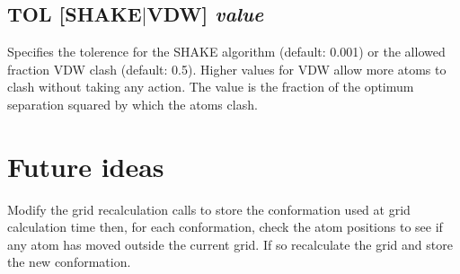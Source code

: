 \documentclass[12pt]{article}
\begin{document}
\subsection{TOL [SHAKE$\mid$VDW] {\em value}}
Specifies the tolerence for the SHAKE algorithm (default: 0.001) or
the allowed fraction VDW clash (default: 0.5). Higher values for VDW
allow more atoms to clash without taking any action. The value is the
fraction of the optimum separation squared by which the atoms clash.

\section{Future ideas}

Modify the grid recalculation calls to store the conformation used at grid
calculation time then, for each conformation, check the atom positions to see if
any atom has moved outside the current grid. If so recalculate the grid and
store the new conformation.
\end{document}
